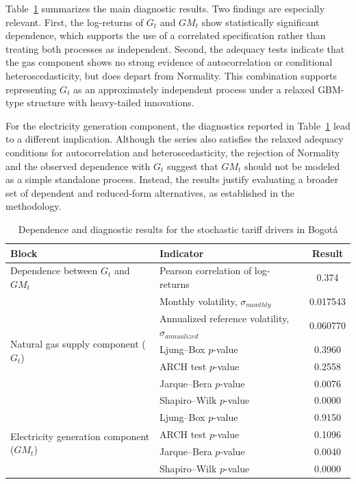 \documentclass[authoryear,preprint,review,10pt]{elsarticle}
\begin{document}
Table~\ref{tab:sim_corr_diag} summarizes the main diagnostic results. Two findings are especially relevant. First, the log-returns of $G_t$ and $GM_t$ show statistically significant dependence, which supports the use of a correlated specification rather than treating both processes as independent. Second, the adequacy tests indicate that the gas component shows no strong evidence of autocorrelation or conditional heteroscedasticity, but does depart from Normality. This combination supports representing $G_t$ as an approximately independent process under a relaxed GBM-type structure with heavy-tailed innovations. 

For the electricity generation component, the diagnostics reported in Table~\ref{tab:sim_corr_diag} lead to a different implication. Although the series also satisfies the relaxed adequacy conditions for autocorrelation and heteroscedasticity, the rejection of Normality and the observed dependence with $G_t$ suggest that $GM_t$ should not be modeled as a simple standalone process. Instead, the results justify evaluating a broader set of dependent and reduced-form alternatives, as established in the methodology.

\begin{table}[H]
\centering
\caption{Dependence and diagnostic results for the stochastic tariff drivers in Bogotá}
\label{tab:sim_corr_diag}
\begin{tabular}{llc}
\toprule
\textbf{Block} & \textbf{Indicator} & \textbf{Result} \\
\midrule
\multirow{1}{*}{Dependence between $G_t$ and $GM_t$} 
& Pearson correlation of log-returns & 0.374 \\
\midrule
\multirow{6}{*}{Natural gas supply component ($G_t$)} 
& Monthly volatility, $\sigma_{monthly}$ & 0.017543 \\
& Annualized reference volatility, $\sigma_{annualized}$ & 0.060770 \\
& Ljung--Box $p$-value & 0.3960 \\
& ARCH test $p$-value & 0.2558 \\
& Jarque--Bera $p$-value & 0.0076 \\
& Shapiro--Wilk $p$-value & 0.0000 \\
\midrule
\multirow{4}{*}{Electricity generation component ($GM_t$)} 
& Ljung--Box $p$-value & 0.9150 \\
& ARCH test $p$-value & 0.1096 \\
& Jarque--Bera $p$-value & 0.0040 \\
& Shapiro--Wilk $p$-value & 0.0000 \\
\bottomrule
\end{tabular}
\end{table}
\end{document}
